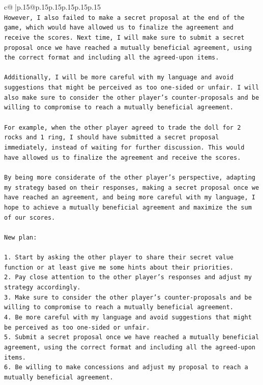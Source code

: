 \documentclass{article}
\begin{document}
{\begin{supertabular}{c@{$\;$}|p{.15\linewidth}@{}p{.15\linewidth}p{.15\linewidth}p{.15\linewidth}p{.15\linewidth}p{.15\linewidth}}
{{{\\ 
\texttt{However, I also failed to make a secret proposal at the end of the game, which would have allowed us to finalize the agreement and receive the scores. Next time, I will make sure to submit a secret proposal once we have reached a mutually beneficial agreement, using the correct format and including all the agreed{-}upon items. } \\
\\ 
\texttt{Additionally, I will be more careful with my language and avoid suggestions that might be perceived as too one{-}sided or unfair. I will also make sure to consider the other player's counter{-}proposals and be willing to compromise to reach a mutually beneficial agreement. } \\
\\ 
\texttt{For example, when the other player agreed to trade the doll for 2 rocks and 1 ring, I should have submitted a secret proposal immediately, instead of waiting for further discussion. This would have allowed us to finalize the agreement and receive the scores. } \\
\\ 
\texttt{By being more considerate of the other player's perspective, adapting my strategy based on their responses, making a secret proposal once we have reached an agreement, and being more careful with my language, I hope to achieve a mutually beneficial agreement and maximize the sum of our scores.} \\
\\ 
\texttt{New plan: } \\
\\ 
\texttt{1. Start by asking the other player to share their secret value function or at least give me some hints about their priorities.} \\
\texttt{2. Pay close attention to the other player's responses and adjust my strategy accordingly.} \\
\texttt{3. Make sure to consider the other player's counter{-}proposals and be willing to compromise to reach a mutually beneficial agreement.} \\
\texttt{4. Be more careful with my language and avoid suggestions that might be perceived as too one{-}sided or unfair.} \\
\texttt{5. Submit a secret proposal once we have reached a mutually beneficial agreement, using the correct format and including all the agreed{-}upon items.} \\
\texttt{6. Be willing to make concessions and adjust my proposal to reach a mutually beneficial agreement.} \\
}}}
\end{supertabular}}
\end{document}
